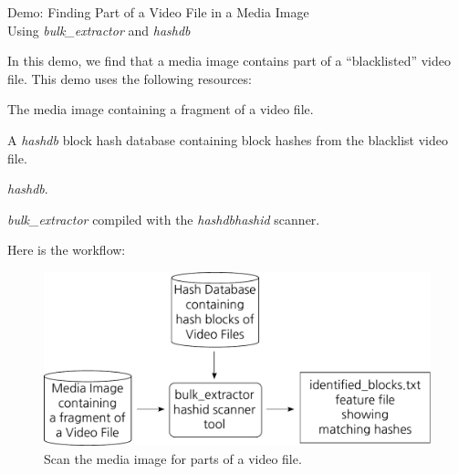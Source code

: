 \documentclass[12pt,twoside]{article}
\newcommand{\hdb}{\emph{hashdb}\xspace}
\newcommand{\bulk}{\emph{bulk\_extractor}\xspace}
\newcommand{\hashid}{\emph{hashid}\xspace}
\begin{document}
\begin{center}
\Large Demo: Finding Part of a Video File in a Media Image \\
\large Using \bulk and \hdb
\end{center}

In this demo, we find that a media image contains part of a
``blacklisted'' video file.
This demo uses the following resources:
\begin{compactitem}
\item The media image containing a fragment of a video file.
\item A \hdb block hash database containing block hashes
from the blacklist video file.
\item \hdb.
\item \bulk compiled with the \hdb \hashid scanner.
\end{compactitem}

Here is the workflow:

\begin{figure}[H]
  \center
  \includegraphics[scale=0.6]{drawings/scan_hashid}
  \caption*{Scan the media image for parts of a video file.}
  \label{fig:scan_hashid}
\end{figure}
\end{document}
